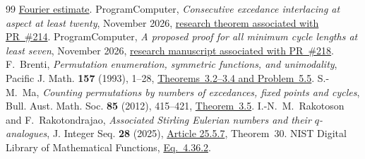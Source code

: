 \documentclass[11pt]{article}
\begin{document}
\begin{thebibliography}{99}
\href{https://github.com/ProgramComputer/open-math-research/blob/e554fb387edbf68f5e2094773016f81b9d618498/topics/long-cycle-excedances/fourier-circle/README.md}{Fourier estimate}.
ProgramComputer, \emph{Consecutive excedance interlacing at aspect at least twenty}, November 2026,
\href{https://github.com/ProgramComputer/open-math-research/blob/6db8b1ec8c75269898e64b8676fe12983f7f008c/topics/long-cycle-excedances/aspect-20/README.md}{research theorem associated with PR~\#214}.
ProgramComputer, \emph{A proposed proof for all minimum cycle lengths at least seven}, November 2026,
\href{https://github.com/ProgramComputer/open-math-research/blob/a9f329264e850ab4142880e5e68a0c2496cf4a34/topics/long-cycle-excedances/all-large-cutoffs.tex}{research manuscript associated with PR~\#218}.
F.~Brenti, \emph{Permutation enumeration, symmetric functions, and
unimodality}, Pacific J. Math. \textbf{157} (1993), 1--28,
\href{https://msp.org/pjm/1993/157-1/pjm-v157-n1-p01-s.pdf}{Theorems~3.2--3.4 and Problem~5.5}.
S.-M.~Ma, \emph{Counting permutations by numbers of excedances, fixed points
and cycles}, Bull. Aust. Math. Soc. \textbf{85} (2012), 415--421,
\href{https://doi.org/10.1017/S0004972711002760}{Theorem~3.5}.
I.-N.~M.~Rakotoson and F.~Rakotondrajao,
\emph{Associated Stirling Eulerian numbers and their \(q\)-analogues},
J. Integer Seq. \textbf{28} (2025),
\href{https://cs.uwaterloo.ca/journals/JIS/VOL28/Rakotoson/rakoto12.html}{Article 25.5.7},
Theorem~30.
NIST Digital Library of Mathematical Functions,
\href{https://dlmf.nist.gov/4.36.E2}{Eq.~4.36.2}.
\end{thebibliography}
\endgroup
\end{document}
